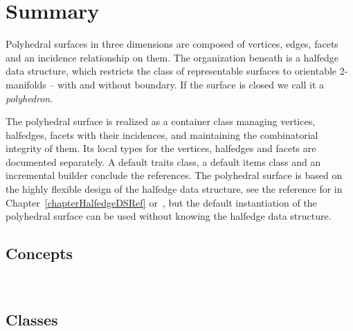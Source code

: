 \section*{Summary}

Polyhedral surfaces in three dimensions are composed of vertices,
edges, facets and an incidence relationship on them. The organization
beneath is a halfedge data structure, which restricts the class of
representable surfaces to orientable 2-manifolds -- with and without
boundary. If the surface is closed we call it a {\em polyhedron}.

The polyhedral surface is realized as a container class managing
vertices, halfedges, facets with their incidences, and maintaining the
combinatorial integrity of them. Its local types for the vertices,
halfedges and facets are documented separately.  A default traits
class, a default items class and an incremental builder conclude the
references. The polyhedral surface is based on the highly flexible
design of the halfedge data structure, see the reference for
 in Chapter~\ref{chapterHalfedgeDSRef}
or~\cite{k-ugpdd-99}, but the default instantiation of the polyhedral
surface can be used without knowing the halfedge data structure.

\subsection*{Concepts}

\\ 

\subsection*{Classes}

\\ 
\\ 
\\ 
\\ 
\\ 
\\ 
\\ 

